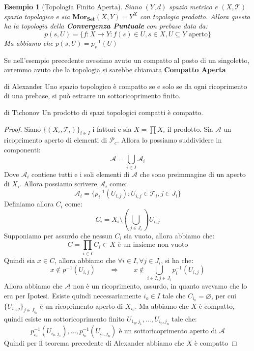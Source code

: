 \documentclass[11pt,a4paper,twoside]{article}
\newtheorem{es}{Esempio}
\theoremstyle{definition}
\begin{document}
\begin{es}[Topologia Finito Aperta]
	Siano $(Y,d)$ spazio metrico e $(X, \mathcal T)$ spazio topologico e sia $\bm{Mor_{Set}}(X,Y) = Y^X$ con topologia prodotto. Allora questo ha la topologia della \textbf{Convergenza Puntuale} con prebase data da:
	\[ p(s,U) = \{ f:X \to Y: f(s) \in U, s \in X, U \subseteq Y \text{ aperto} \} \]
	Ma abbiamo che $p(s, U) = p^{-1}_s(U)$
\end{es}

Se nell'esempio precedente avessimo avuto un compatto al posto di un singoletto, avremmo avuto che la topologia si sarebbe chiamata \textbf{Compatto Aperta}

\begin{thm}{di Alexander}{}
	Uno spazio topologico è compatto se e solo se da ogni ricoprimento di una prebase, si può estrarre un sottoricoprimento finito.
\end{thm}

\begin{thm}{di Tichonov}{}
	Un prodotto di spazi topologici compatti è compatto.
\end{thm}
\begin{proof}
	Siano $\{(X_i, \mathcal T_i)\}_{i \in I}$ i fattori e sia $X = \prod X_i$ il prodotto. Sia $\mathcal A$ un ricoprimento aperto di elementi di $\mathcal P_c$. Allora lo possiamo suddividere in componenti:
	\[ \mathcal A = \bigcup_{i \in I}\mathcal A_i \]
	Dove $\mathcal A_i$ contiene tutti e i soli elementi di $\mathcal A$ che sono preimmagine di un aperto di $X_i$. Allora possiamo scrivere $\mathcal A_i$ come:
	\[ \mathcal A_i = \{ p_i^{-1}(U_{i,j}) : U_{i,j} \in \mathcal T_i, j \in J_i \} \]
	Definiamo allora $C_i$ come:
	\[ C_i = X_i \setminus \left( \bigcup_{j \in J_i} \right)U_{i,j} \]
	Supponiamo per assurdo che nessun $C_i$ sia vuoto, allora abbiamo che:
	\[ C = \prod_{i \in I} C_i \subset X \text{ è un insieme non vuoto} \]
	Quindi sia $x \in C$, allora abbiamo che $\forall i \in I, \forall j \in J_i$, si ha che:
	\[x \not \in p^{-1}(U_{i,j}) \qquad \Rightarrow \qquad x \not \in \bigcup_{i \in I, j \in J_i} p_i^{-1}(U_{i,j})\]
	Allora abbiamo che $\mathcal A$ non è un ricoprimento, assurdo, in quanto avevamo che lo era per Ipotesi. Esiste quindi necessariamente $i_o \in I$ tale che $C_{i_0} = \varnothing$, per cui $\{U_{i_0, j}\}_{j \in J_{i_0}}$ è un ricoprimento aperto di $X_{i_0}$. Ma abbiamo che $X$ è compatto, quindi esiste un sottoricoprimento finito $U_{1_0,j_1},...,U_{i_0, j_n}$ tale che:
	\[ p_{i_0}^{-1}(U_{i_0,j_1}),...,p_{i_0}^{-1}(U_{i_0,j_n}) \text{ è un sottoricoprimento aperto di }\mathcal A\]
	Quindi per il teorema precedente di Alexander abbiamo che $X$ è compatto
\end{proof}
\end{document}
